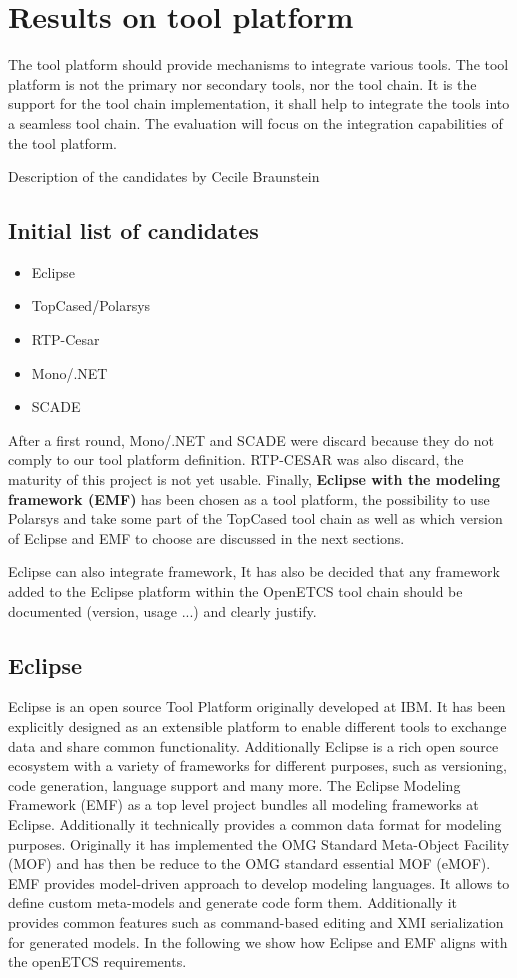 
\chapter{Results on tool platform}
The tool platform should provide mechanisms to integrate various
tools. The tool platform is not the primary nor secondary tools, nor
the tool chain. It is the support for the tool chain implementation,
it shall help to integrate the tools into a seamless tool chain.
The evaluation will focus on the integration capabilities of the tool platform.
\begin{todo_comment}
Description of the candidates by Cecile Braunstein
\end{todo_comment}

\section{Initial list of candidates}
\begin{itemize}
\item Eclipse 
\item TopCased/Polarsys
\item RTP-Cesar
\item Mono/.NET 
\item SCADE
\end{itemize}

After a first round, Mono/.NET and SCADE were discard because they do
not comply to our tool platform definition.  RTP-CESAR was also
discard, the maturity of this project is not yet usable. Finally,
{\bf Eclipse with the modeling framework (EMF)} has been chosen as a tool
platform, the possibility to use Polarsys and take some part of the
TopCased tool chain as well as which version of Eclipse  and EMF to choose are
discussed in the next sections.  

Eclipse can also integrate framework, It has also be decided that any
framework added to the Eclipse platform within the OpenETCS tool chain
should be documented (version, usage ...) and clearly justify.

\section{Eclipse}
Eclipse is an open source Tool Platform originally developed at
IBM. It has been explicitly designed as an extensible platform to
enable different tools to exchange data and share common
functionality. Additionally Eclipse is a rich open source ecosystem
with a variety of frameworks for different purposes, such as
versioning, code generation, language support and many more. The
Eclipse Modeling Framework (EMF) as a top level project bundles all
modeling frameworks at Eclipse. Additionally it technically provides a
common data format for modeling purposes. Originally it has
implemented the OMG Standard Meta-Object Facility (MOF) and has then
be reduce to the OMG standard essential MOF (eMOF). EMF provides
model-driven approach to develop modeling languages. It allows to
define custom meta-models and generate code form them. Additionally it
provides common features such as command-based editing and XMI
serialization for generated models. In the following we show how
Eclipse and EMF aligns with the openETCS requirements.

